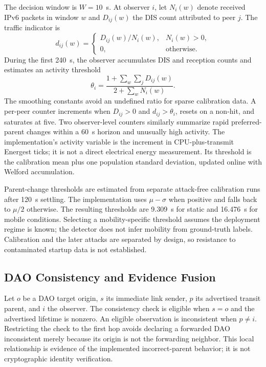 The decision window is $W=10$~s. At observer $i$, let $N_i(w)$ denote received IPv6 packets in window $w$ and $D_{ij}(w)$ the DIS count attributed to peer $j$. The traffic indicator is
\begin{equation}
 d_{ij}(w)=\begin{cases}D_{ij}(w)/N_i(w),&N_i(w)>0,\\0,&\text{otherwise.}\end{cases}
\end{equation}
During the first 240~s, the observer accumulates DIS and reception counts and estimates an activity threshold
\begin{equation}
 \theta_i=\frac{1+\sum_w\sum_jD_{ij}(w)}{2+\sum_wN_i(w)}.
\end{equation}
The smoothing constants avoid an undefined ratio for sparse calibration data. A per-peer counter increments when $D_{ij}>0$ and $d_{ij}>\theta_i$, resets on a non-hit, and saturates at five. Two observer-level counters similarly summarize rapid preferred-parent changes within a 60~s horizon and unusually high activity. The implementation's activity variable is the increment in CPU-plus-transmit Energest ticks; it is not a direct electrical energy measurement. Its threshold is the calibration mean plus one population standard deviation, updated online with Welford accumulation.

Parent-change thresholds are estimated from separate attack-free calibration runs after 120~s settling. The implementation uses $\mu-\sigma$ when positive and falls back to $\mu/2$ otherwise. The resulting thresholds are 9.309~s for static and 16.476~s for mobile conditions. Selecting a mobility-specific threshold assumes the deployment regime is known; the detector does not infer mobility from ground-truth labels. Calibration and the later attacks are separated by design, so resistance to contaminated startup data is not established.

\subsection{DAO Consistency and Evidence Fusion}
Let $o$ be a DAO target origin, $s$ its immediate link sender, $p$ its advertised transit parent, and $i$ the observer. The consistency check is eligible when $s=o$ and the advertised lifetime is nonzero. An eligible observation is inconsistent when $p\ne i$. Restricting the check to the first hop avoids declaring a forwarded DAO inconsistent merely because its origin is not the forwarding neighbor. This local relationship is evidence of the implemented incorrect-parent behavior; it is not cryptographic identity verification.


